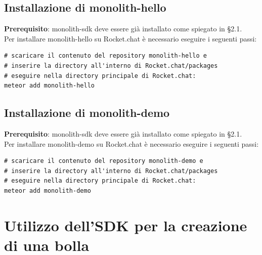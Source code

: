 \subsection{Installazione di monolith-hello}
\textbf{Prerequisito}: monolith-sdk deve essere già installato come spiegato in \S 2.1. \\
Per installare monolith-hello su Rocket.chat è necessario eseguire i seguenti passi: 

\begin{lstlisting}
# scaricare il contenuto del repository monolith-hello e 
# inserire la directory all'interno di Rocket.chat/packages
# eseguire nella directory principale di Rocket.chat:
meteor add monolith-hello
\end{lstlisting}


\subsection{Installazione di monolith-demo}
\textbf{Prerequisito}: monolith-sdk deve essere già installato come spiegato in \S 2.1. \\
Per installare monolith-demo su Rocket.chat è necessario eseguire i seguenti passi: 

\begin{lstlisting}
# scaricare il contenuto del repository monolith-demo e 
# inserire la directory all'interno di Rocket.chat/packages
# eseguire nella directory principale di Rocket.chat:
meteor add monolith-demo
\end{lstlisting}


\section[Come creare una bolla]{Utilizzo dell'SDK per la creazione di una bolla}

